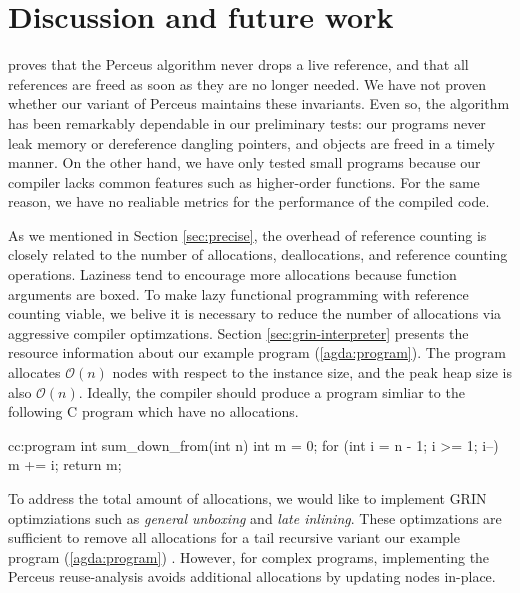 \documentclass[9pt, twocolumn]{article}
\newcommand{\refp}[1]{(\ref{#1})}
\begin{document}
\section{Discussion and future work}
\label{sec:discussion-and-future-work}
\citet{reinking2021} proves that the Perceus algorithm never drops a live reference, and that all references are freed as soon as they are no longer needed.
We have not proven whether our variant of Perceus maintains these invariants.
Even so, the algorithm has been remarkably dependable in our preliminary tests: our programs never leak memory or dereference dangling pointers, and objects are freed in a timely manner.
On the other hand, we have only tested small programs because our compiler lacks common features such as higher-order functions. 
For the same reason, we have no realiable metrics for the performance of the compiled code.

As we mentioned in Section \ref{sec:precise}, the overhead of reference counting is closely related to the number of allocations, deallocations, and reference counting operations.
Laziness tend to encourage more allocations because function arguments are boxed.
To make lazy functional programming with reference counting viable, we belive it is necessary to reduce the number of allocations via aggressive compiler optimzations.
Section \ref{sec:grin-interpreter} presents the resource information about our example program \refp{agda:program}. 
The program allocates $\mathcal{O}(n)$ nodes with respect to the instance size, and the peak heap size is also $\mathcal{O}(n)$.
Ideally, the compiler should produce a program simliar to the following C program which have no allocations.

\begin{typewriter}{c}{c:program}
int sum_down_from(int n){
  int m = 0;
  for (int i = n - 1; i >= 1; i--) 
    m += i;
  return m;
}
\end{typewriter}
To address the total amount of allocations, we would like to implement GRIN optimziations such as \emph{general unboxing} and \emph{late inlining}. 
These optimzations are sufficient to remove all allocations for a tail recursive variant our example program \refp{agda:program} \citep{boquist1999}.
However, for complex programs, implementing the Perceus reuse-analysis avoids additional allocations by updating nodes \mbox{in-place}. 
\end{document}
